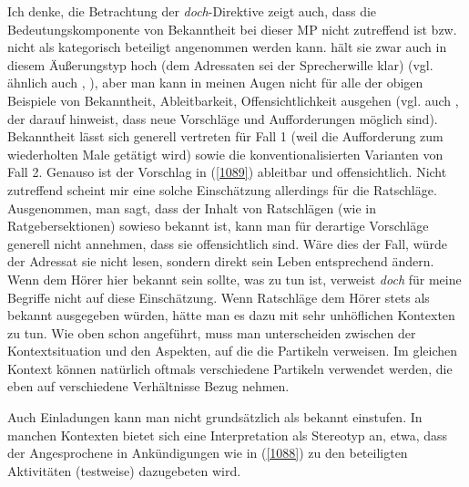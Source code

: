 {Ich denke, die Betrachtung der \textit{doch}-Direktive zeigt auch, dass die Bedeutungs\-komponente von Bekanntheit bei dieser MP nicht zutreffend ist bzw. nicht als kategorisch beteiligt angenommen werden kann. \citet[118-119]{Thurmair1989} hält sie zwar auch in diesem Äußerungstyp hoch (dem Adressaten sei der Sprecherwille klar) (vgl. ähnlich auch \citealt[111]{Bublitz1978}, \citealt[168]{Karagjosova2004}), aber man kann in meinen Augen nicht für alle der obigen Beispiele von Bekanntheit, Ableitbarkeit, Offensichtlichkeit ausgehen (vgl. auch \citealt[401]{Ickler1994}, der darauf hinweist, dass neue Vorschläge und Aufforderungen möglich sind). Bekanntheit lässt sich generell vertreten für Fall 1 (weil die Aufforderung zum wiederholten Male getätigt wird) sowie die konventionalisierten Varianten von Fall 2. Genauso ist der Vorschlag in (\ref{1089}) ableitbar und offensichtlich. Nicht zutreffend scheint mir eine solche Einschätzung allerdings für die Ratschläge. Ausgenommen, man sagt, dass der Inhalt von Ratschlägen (wie in Ratgebersektionen) sowieso bekannt ist, kann man für derartige Vorschläge generell nicht annehmen, dass sie offensichtlich sind. Wäre dies der Fall, würde der Adressat sie nicht lesen, sondern direkt sein Leben entsprechend ändern. Wenn dem Hörer hier bekannt sein sollte, was zu tun ist, verweist \textit{doch} für meine Begriffe nicht auf diese Einschätzung. Wenn Ratschläge dem Hörer stets als bekannt ausgegeben würden, hätte man es dazu mit sehr unhöflichen Kontexten zu tun. Wie oben schon angeführt, muss man unterscheiden zwischen der Kontextsituation und den Aspekten, auf die die Partikeln verweisen. Im gleichen Kontext können natürlich oftmals verschiedene Partikeln verwendet werden, die eben auf verschiedene Verhältnisse Bezug nehmen.

Auch Einladungen kann man nicht grundsätzlich als bekannt einstufen. In manchen Kontexten bietet sich eine Interpretation als Stereotyp an, etwa, dass der Angesprochene in Ankündigungen wie in (\ref{1088}) zu den beteiligten Aktivitäten (testweise) dazugebeten wird. 
 
}
